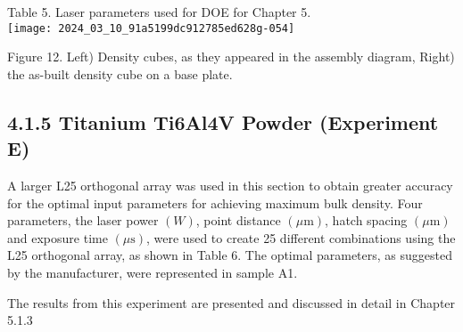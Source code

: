 \documentclass[10pt]{article}
\begin{document}
Table 5. Laser parameters used for DOE for Chapter 5.\\
\texttt{[image: 2024\_03\_10\_91a5199dc912785ed628g-054]}

Figure 12. Left) Density cubes, as they appeared in the assembly diagram, Right) the as-built density cube on a base plate.

\subsection*{4.1.5 Titanium Ti6Al4V Powder (Experiment E)}
A larger L25 orthogonal array was used in this section to obtain greater accuracy for the optimal input parameters for achieving maximum bulk density. Four parameters, the laser power $(W)$, point distance $(\mu \mathrm{m})$, hatch spacing $(\mu \mathrm{m})$ and exposure time $(\mu \mathrm{s})$, were used to create 25 different combinations using the L25 orthogonal array, as shown in Table 6. The optimal parameters, as suggested by the manufacturer, were represented in sample A1.

The results from this experiment are presented and discussed in detail in Chapter 5.1.3
\end{document}
